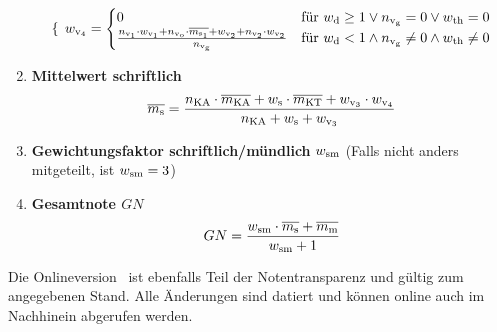 \begin{enumerate}[label=\textbf{(\arabic*)}, align=left, leftmargin=*]
\[\begin{cases}
	\end{cases}
	\,
	w_{\mathrm{v}_4} =
	\begin{cases}
		0 & \text{für }  w_{\mathrm{d}} \geq 1 \lor n_{\mathrm{v}_\mathrm{g}}=0 \lor w_{\mathrm{th}} = 0\\
		\frac{n_{\mathrm{v}_1} \cdot w_{\mathrm{v}_1} + n_{\mathrm{v}_\mathrm{o}} \cdot \overline{m_{\mathrm{s}_1}} + w_{\mathrm{v}_2} + n_{\mathrm{v}_2} \cdot w_{\mathrm{v}_2}}{n_{\mathrm{v}_\mathrm{g}}} & \text{für }    w_{\mathrm{d}} < 1 \land n_{\mathrm{v}_\mathrm{g}} \neq 0 \land  w_{\mathrm{th}} \neq 0\\
	\end{cases}
	\]	
	\item \textbf{Mittelwert schriftlich}
	\vspace{-0.3cm}
	\[
	\overline{m_{\mathrm{s}}} = \frac{ n_{\mathrm{KA}} \cdot \overline{m_{\mathrm{KA}}} + w_{\mathrm{s}} \cdot \overline{m_{\mathrm{KT}}} +w_{\mathrm{v}_3} \cdot w_{\mathrm{v}_4}   }{n_{\mathrm{KA}} + w_{\mathrm{s}} + w_{\mathrm{v}_3}}
	\]
	\item \textbf{Gewichtungsfaktor schriftlich/mündlich} $w_{\mathrm{sm}}$ (Falls nicht anders mitgeteilt, ist $w_{\mathrm{sm}}=3$)
	\item \textbf{Gesamtnote $GN$}
	\[
	GN = \frac{w_{\mathrm{sm}} \cdot \overline{m_{\mathrm{s}}} + \overline{m_{\mathrm{m}}}}{w_{\mathrm{sm}}+1}
	\]
\end{enumerate}

\renewcommand\refname{\footnotesize Quellen}
\renewcommand{\bibname}{Quellen}

\vfill


\begingroup
\tiny
\setlength{\bibsep}{0pt}


\endgroup

{\tiny Die Onlineversion \onlinedoc \, ist ebenfalls Teil der Notentransparenz und gültig zum angegebenen Stand. Alle Änderungen sind datiert und können online auch im Nachhinein abgerufen werden.}